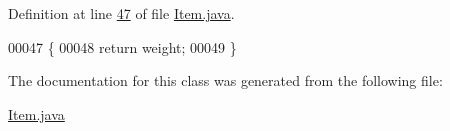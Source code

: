 Definition at line \hyperlink{Item_8java_source_l00047}{47} of file \hyperlink{Item_8java_source}{Item.\-java}.


\begin{DoxyCode}
00047                            \{
00048         \textcolor{keywordflow}{return} weight;
00049     \}
\end{DoxyCode}


The documentation for this class was generated from the following file\-:\begin{DoxyCompactItemize}
\item 
\hyperlink{Item_8java}{Item.\-java}\end{DoxyCompactItemize}
